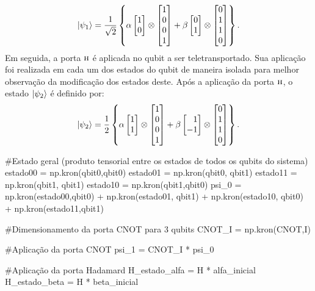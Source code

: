 \[
  \ket{\psi_1} = \frac{1}{\sqrt2} \left\{
    \alpha
    \begin{bmatrix} 1 \\ 0 \end{bmatrix} \otimes
    \begin{bmatrix} 1 \\ 0 \\ 0 \\ 1 \end{bmatrix} +
    \beta
    \begin{bmatrix} 0 \\ 1 \end{bmatrix} \otimes
    \begin{bmatrix} 0 \\ 1 \\ 1 \\ 0 \end{bmatrix}
  \right\}.
\]
Em seguida, a porta \(\operatorname{\textsc{h}}\) é aplicada no qubit a ser teletransportado. Sua aplicação foi realizada em cada um dos estados do qubit de maneira isolada para melhor observação da modificação dos estados deste. Após a aplicação da porta \(\operatorname{\textsc{h}}\), o estado \(\ket{\psi_2}\) é definido por:
\[
  \ket{\psi_2} = \frac{1}{2} \left\{
    \alpha
    \begin{bmatrix} 1 \\ 1 \end{bmatrix} \otimes
    \begin{bmatrix} 1 \\ 0 \\ 0 \\ 1 \end{bmatrix} +
    \beta
    \begin{bmatrix*}[r] 1 \\ -1 \end{bmatrix*} \otimes
    \begin{bmatrix} 0 \\ 1 \\ 1 \\ 0 \end{bmatrix}
  \right\}.
\]

\begin{pycode}
    #Estado geral (produto tensorial entre os estados de todos os qubits do sistema)
	estado00 = np.kron(qbit0,qbit0)
	estado01 = np.kron(qbit0, qbit1)
	estado11 = np.kron(qbit1, qbit1)
	estado10 = np.kron(qbit1,qbit0)
	psi_0 = np.kron(estado00,qbit0) + np.kron(estado01, qbit1) + np.kron(estado10, qbit0) + np.kron(estado11,qbit1)

	#Dimensionamento da porta CNOT para 3 qubits
	CNOT_I = np.kron(CNOT,I)

	#Aplicação da porta CNOT
	psi_1 = CNOT_I * psi_0

	#Aplicação da porta Hadamard
	H_estado_alfa = H * alfa_inicial
	H_estado_beta = H * beta_inicial
\end{pycode}

